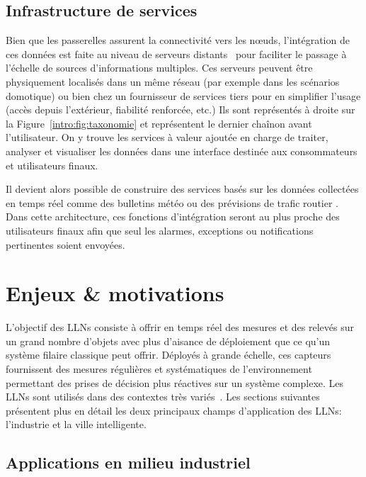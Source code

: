 \subsection{Infrastructure de services}

Bien que les passerelles assurent la connectivité vers les nœuds, l'intégration de ces données est faite au niveau de serveurs distants~\cite{anton2014machine, atzori2010internet} pour faciliter le passage à l'échelle de sources d'informations multiples.
Ces serveurs peuvent être physiquement localisés dans un même réseau (par exemple dans les scénarios domotique) ou bien chez un fournisseur de services tiers pour en simplifier l'usage (accès depuis l'extérieur, fiabilité renforcée, etc.)
Ils sont représentés à droite sur la Figure~\ref{intro:fig:taxonomie} et représentent le dernier chaînon avant l'utilisateur.
On y trouve les services à valeur ajoutée en charge de traiter, analyser et visualiser les données dans une interface destinée aux consommateurs et utilisateurs finaux.

Il devient alors possible de construire des services basés sur les données collectées en temps réel comme des bulletins météo ou des prévisions de trafic routier \cite{hart2006environmental, gubbi2013internet}.
Dans cette architecture, ces fonctions d'intégration seront au plus proche des utilisateurs finaux afin que seul les alarmes, exceptions ou notifications pertinentes soient envoyées.

\section{Enjeux \& motivations}
\label{intro:motivations}

L'objectif des \ac{LLN}s consiste à offrir en temps réel des mesures et des relevés sur un grand nombre d'objets avec plus d'aisance de déploiement que ce qu'un système filaire classique peut offrir.
Déployés à grande échelle, ces capteurs fournissent des mesures régulières et systématiques de l'environnement permettant des prises de décision plus réactives sur un système complexe.
Les \ac{LLN}s sont utilisés dans des contextes très variés~\cite{anton2014machine, atzori2010internet}.
Les sections suivantes présentent plus en détail les deux principaux champs d'application des \ac{LLN}s: l'industrie et la ville intelligente.

\subsection{Applications en milieu industriel}


